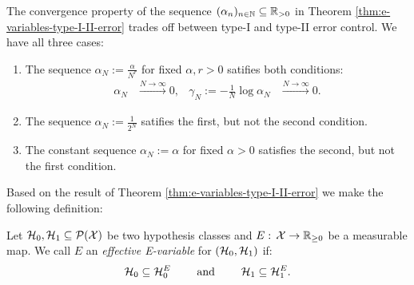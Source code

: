 \begin{Rem}
    The convergence property of the sequence $(\alpha_n)_{n \in \mathbb{N}} \subseteq \mathbb{R}_{>0}$ in Theorem \ref{thm:e-variables-type-I-II-error} trades off between
    type-I and type-II error control. We have all three cases:
    \begin{enumerate}
        \item The sequence $\alpha_N:=\frac{\alpha}{N^r}$ for fixed $\alpha,r >0$ satifies both conditions:
             \begin{align*} 
                 \alpha_N &\stackrel{N \to \infty}{\longrightarrow} 0, &\gamma_N:=-\frac{1}{N} \log \alpha_N &\stackrel{N \to \infty}{\longrightarrow} 0. 
         \end{align*}
     \item The sequence $\alpha_N:=\frac{1}{2^N}$ satifies the first, but not the second condition.
     \item The constant sequence $\alpha_N:=\alpha$ for fixed $\alpha > 0$ satisfies the second, but not the first condition.
    \end{enumerate}
\end{Rem}

Based on the result of Theorem \ref{thm:e-variables-type-I-II-error} we make the following definition:

\begin{Def}
 Let $\mathcal{H}_0,\mathcal{H}_1 \subseteq \mathcal{P}(\mathcal{X})$ be two hypothesis classes and $E:\, \mathcal{X} \to \mathbb{R}_{\ge0}$ be a measurable map.
 We call $E$ an \emph{effective E-variable} for $(\mathcal{H}_0,\mathcal{H}_1)$ if:
 \[ \mathcal{H}_0 \subseteq \mathcal{H}_0^E \qquad \text{ and } \qquad \mathcal{H}_1 \subseteq \mathcal{H}_1^E. \]
\end{Def}

